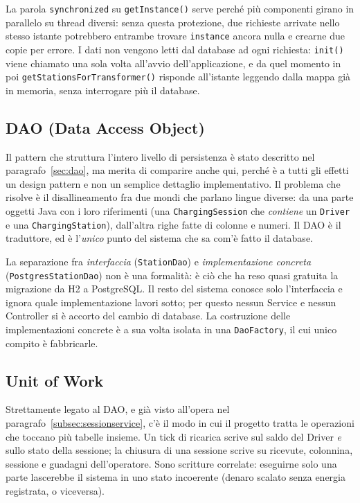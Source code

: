 La parola \texttt{synchronized} su \texttt{getInstance()} serve perché più componenti girano in parallelo su thread diversi: senza questa protezione, due richieste arrivate nello stesso istante potrebbero entrambe trovare \texttt{instance} ancora nulla e crearne due copie per errore. I dati non vengono letti dal database ad ogni richiesta: \texttt{init()} viene chiamato una sola volta all'avvio dell'applicazione, e da quel momento in poi \texttt{getStationsForTransformer()} risponde all'istante leggendo dalla mappa già in memoria, senza interrogare più il database.

\subsection{DAO (Data Access Object)}

Il pattern che struttura l'intero livello di persistenza è stato descritto nel paragrafo~\ref{sec:dao}, ma merita di comparire anche qui, perché è a tutti gli effetti un design pattern e non un semplice dettaglio implementativo. Il problema che risolve è il disallineamento fra due mondi che parlano lingue diverse: da una parte oggetti Java con i loro riferimenti (una \texttt{ChargingSession} che \emph{contiene} un \texttt{Driver} e una \texttt{ChargingStation}), dall'altra righe fatte di colonne e numeri. Il DAO è il traduttore, ed è l'\emph{unico} punto del sistema che sa com'è fatto il database.

La separazione fra \emph{interfaccia} (\texttt{StationDao}) e \emph{implementazione concreta} (\texttt{PostgresStationDao}) non è una formalità: è ciò che ha reso quasi gratuita la migrazione da H2 a PostgreSQL. Il resto del sistema conosce solo l'interfaccia e ignora quale implementazione lavori sotto; per questo nessun Service e nessun Controller si è accorto del cambio di database. La costruzione delle implementazioni concrete è a sua volta isolata in una \texttt{DaoFactory}, il cui unico compito è fabbricarle.

\subsection{Unit of Work}

Strettamente legato al DAO, e già visto all'opera nel paragrafo~\ref{subsec:sessionservice}, c'è il modo in cui il progetto tratta le operazioni che toccano più tabelle insieme. Un tick di ricarica scrive sul saldo del Driver \emph{e} sullo stato della sessione; la chiusura di una sessione scrive su ricevute, colonnina, sessione e guadagni dell'operatore. Sono scritture correlate: eseguirne solo una parte lascerebbe il sistema in uno stato incoerente (denaro scalato senza energia registrata, o viceversa).


